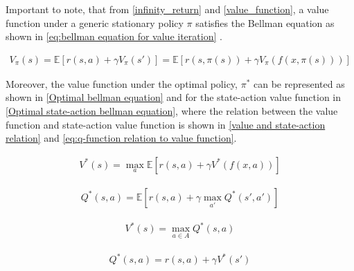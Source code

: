 Important to note, that from \autoref{infinity_return} and \autoref{value_function}, a value function under a generic stationary policy $\pi$ satisfies the Bellman equation as shown in \autoref{eq:bellman equation for value iteration} \cite{bertsekasNewtonMethodReinforcement2022,bellmanDynamicProgramming1966}.


\begin{equation}
	\begin{aligned}
		V_{\pi}(s) = \mathbb{E} \left[r(s,a) + \gamma V_{\pi}(s') \right] = \mathbb{E} \left[r(s,\pi(s)) + \gamma V_{\pi}(f(x,\pi(s))) \right]
	\end{aligned}
	\label{eq:bellman equation for value iteration}
\end{equation}

Moreover, the value function under the optimal policy, $\pi^*$ can be represented as shown in \autoref{Optimal bellman equation} and for the state-action value function in \autoref{Optimal state-action bellman equation}, where the relation between the value function and state-action value function is shown in \autoref{value and state-action relation} and \autoref{eq:q-function relation to value function}.

\begin{equation}
	\begin{aligned}
		V^*(s) =\max_{a} \mathbb{E} \left[r(s,a) + \gamma V^*(f(x,a)) \right]
	\end{aligned}
	\label{Optimal bellman equation}
\end{equation}

\begin{equation}
	\begin{aligned}
		Q^*(s,a) =\mathbb{E} \left[r(s,a) + \gamma \max_{a'}Q^*(s',a') \right]
	\end{aligned}
	\label{Optimal state-action bellman equation}
\end{equation}

\begin{equation}
	\begin{aligned}
		V^*(s) = \max_{a\in A} Q^*(s, a)
	\end{aligned}
	\label{value and state-action relation}
\end{equation}

\begin{equation}
	\begin{aligned}
		Q^*(s,a) = r(s,a) + \gamma V^*(s') 
	\end{aligned}
	\label{eq:q-function relation to value function}
\end{equation}

